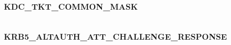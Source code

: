 \documentclass[letterpaper,10pt,english]{sphinxmanual}
\begin{document}
\begin{fulllineitems}
\label{appdev/refs/macros/KDC_OPT_VALIDATE:KDC_OPT_VALIDATE}
\end{fulllineitems}


\begin{tabulary}{\linewidth}{|L|L|}
\hline

 & 
\\
\hline\end{tabulary}



\subsubsection{KDC\_TKT\_COMMON\_MASK}
\label{appdev/refs/macros/KDC_TKT_COMMON_MASK:kdc-tkt-common-mask-data}\label{appdev/refs/macros/KDC_TKT_COMMON_MASK::doc}\label{appdev/refs/macros/KDC_TKT_COMMON_MASK:kdc-tkt-common-mask}

\begin{fulllineitems}
\label{appdev/refs/macros/KDC_TKT_COMMON_MASK:KDC_TKT_COMMON_MASK}
\end{fulllineitems}


\begin{tabulary}{\linewidth}{|L|L|}
\hline

 & 
\\
\hline\end{tabulary}



\subsubsection{KRB5\_ALTAUTH\_ATT\_CHALLENGE\_RESPONSE}
\label{appdev/refs/macros/KRB5_ALTAUTH_ATT_CHALLENGE_RESPONSE:krb5-altauth-att-challenge-response}\label{appdev/refs/macros/KRB5_ALTAUTH_ATT_CHALLENGE_RESPONSE:krb5-altauth-att-challenge-response-data}\label{appdev/refs/macros/KRB5_ALTAUTH_ATT_CHALLENGE_RESPONSE::doc}

\begin{fulllineitems}
\label{appdev/refs/macros/KRB5_ALTAUTH_ATT_CHALLENGE_RESPONSE:KRB5_ALTAUTH_ATT_CHALLENGE_RESPONSE}
\end{fulllineitems}
\end{document}
